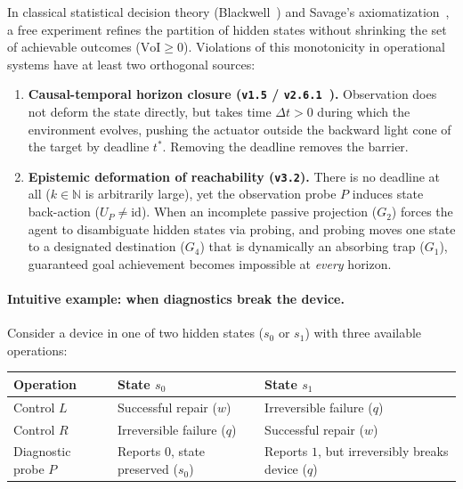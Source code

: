 \documentclass[10pt,a4paper]{article}
\theoremstyle{cleanthm}
\theoremstyle{cleandef}
\begin{document}
In classical statistical decision theory (Blackwell~\cite{blackwell1953}) and Savage's axiomatization~\cite{savage1954}, a free experiment refines the partition of hidden states without shrinking the set of achievable outcomes ($\mathrm{VoI}\ge 0$). Violations of this monotonicity in operational systems have at least two orthogonal sources:
\begin{enumerate}
  \item \textbf{Causal-temporal horizon closure (\texttt{v1.5} / \texttt{v2.6.1}~\cite{strand_v15,strand_v261}).} Observation does not deform the state directly, but takes time $\Delta t>0$ during which the environment evolves, pushing the actuator outside the backward light cone of the target by deadline $t^*$. Removing the deadline removes the barrier.
  \item \textbf{Epistemic deformation of reachability (\texttt{v3.2}).} There is no deadline at all ($k\in\mathbb{N}$ is arbitrarily large), yet the observation probe $P$ induces state back-action ($U_P\ne\mathrm{id}$). When an incomplete passive projection ($G_2$) forces the agent to disambiguate hidden states via probing, and probing moves one state to a designated destination ($G_4$) that is dynamically an absorbing trap ($G_1$), guaranteed goal achievement becomes impossible at \emph{every} horizon.
\end{enumerate}

\paragraph{Intuitive example: when diagnostics break the device.}
Consider a device in one of two hidden states ($s_0$ or $s_1$) with three available operations:

\begin{table}[!htbp]
\centering
\small
\begin{tabularx}{\linewidth}{@{}l >{\raggedright\arraybackslash}X >{\raggedright\arraybackslash}X@{}}
\toprule
\textbf{Operation} & \textbf{State $s_0$} & \textbf{State $s_1$} \\
\midrule
Control $L$ & Successful repair ($w$) & Irreversible failure ($q$) \\
Control $R$ & Irreversible failure ($q$) & Successful repair ($w$) \\
Diagnostic probe $P$ & Reports $0$, state preserved ($s_0$) & Reports $1$, but irreversibly breaks device ($q$) \\
\bottomrule
\end{tabularx}
\end{table}
\end{document}
